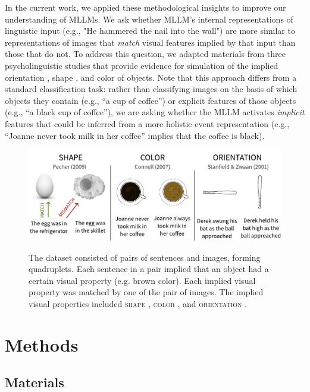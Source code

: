 \documentclass[10pt, a4paper]{article}
\begin{document}
In the current work, we applied these methodological insights to improve our understanding of MLLMs. We ask whether MLLM's internal representations of linguistic input (e.g., "He hammered the nail into the wall") are more similar to representations of images that \textit{match} visual features implied by that input than those that do not. To address this question, we adapted materials from three psycholinguistic studies that provide evidence for simulation of the implied orientation \cite{stanfield2001effect}, shape \cite{pecher2009short}, and color \cite{connell2007representing} of objects. Note that this approach differs from a standard classification task: rather than classifying images on the basis of which objects they contain (e.g., ``a cup of coffee'') or explicit features of those objects (e.g., ``a black cup of coffee''), we are asking whether the MLLM activates \textit{implicit} features that could be inferred from a more holistic event representation (e.g., ``Joanne never took milk in her coffee'' implies that the coffee is black). 

\begin{figure}[ht]
    \includegraphics[width=\textwidth]{images/materials.pdf}
    \label{fig:materials}
    \caption{The dataset consisted of pairs of sentences and images, forming quadruplets. Each sentence in a pair implied that an object had a certain visual property (e.g. brown color). Each implied visual property was matched by one of the pair of images. The implied visual properties included \textsc{shape} \citep[\textbf{Left, }][]{pecher2009short}, \textsc{color} \citep[\textbf{Center}, ][]{connell2007representing}, and \textsc{orientation} \citep[\textbf{Right}, ][]{stanfield2001effect}.
    }
\end{figure}

\section{Methods}

\subsection{Materials}
\end{document}
